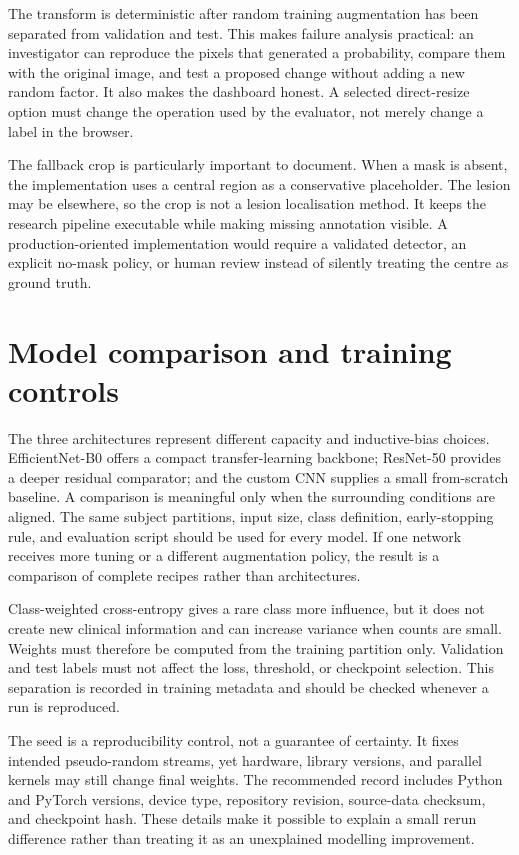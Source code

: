 The transform is deterministic after random training augmentation has been separated from validation and test. This makes failure analysis practical: an investigator can reproduce the pixels that generated a probability, compare them with the original image, and test a proposed change without adding a new random factor. It also makes the dashboard honest. A selected direct-resize option must change the operation used by the evaluator, not merely change a label in the browser.

The fallback crop is particularly important to document. When a mask is absent, the implementation uses a central region as a conservative placeholder. The lesion may be elsewhere, so the crop is not a lesion localisation method. It keeps the research pipeline executable while making missing annotation visible. A production-oriented implementation would require a validated detector, an explicit no-mask policy, or human review instead of silently treating the centre as ground truth.

\section{Model comparison and training controls}
The three architectures represent different capacity and inductive-bias choices. EfficientNet-B0 offers a compact transfer-learning backbone; ResNet-50 provides a deeper residual comparator; and the custom CNN supplies a small from-scratch baseline. A comparison is meaningful only when the surrounding conditions are aligned. The same subject partitions, input size, class definition, early-stopping rule, and evaluation script should be used for every model. If one network receives more tuning or a different augmentation policy, the result is a comparison of complete recipes rather than architectures.

Class-weighted cross-entropy gives a rare class more influence, but it does not create new clinical information and can increase variance when counts are small. Weights must therefore be computed from the training partition only. Validation and test labels must not affect the loss, threshold, or checkpoint selection. This separation is recorded in training metadata and should be checked whenever a run is reproduced.

The seed is a reproducibility control, not a guarantee of certainty. It fixes intended pseudo-random streams, yet hardware, library versions, and parallel kernels may still change final weights. The recommended record includes Python and PyTorch versions, device type, repository revision, source-data checksum, and checkpoint hash. These details make it possible to explain a small rerun difference rather than treating it as an unexplained modelling improvement.

